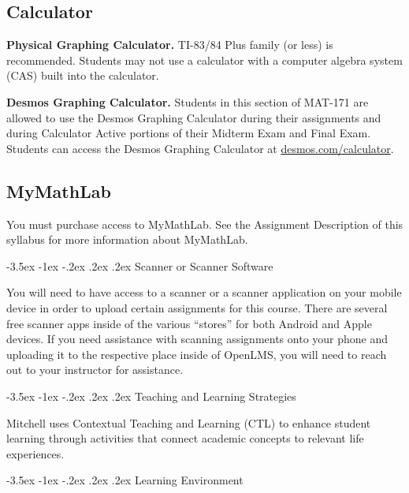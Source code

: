 \documentclass{article}
\makeatletter
\renewcommand\section{\@startsection{section}{1}{0pt}%
  {-3.5ex \@plus -1ex \@minus -.2ex}%
  {.2ex \@plus.2ex}%
  {\normalfont\Large\bfseries}} %
\makeatother
\begin{document}
\subsection{Calculator}

\textbf{Physical Graphing Calculator.} TI-83/84 Plus family (or less) is recommended. Students may not use a calculator with a computer algebra system (CAS) built into the calculator.

\textbf{Desmos Graphing Calculator.} Students in this section of MAT-171 are allowed to use the Desmos Graphing Calculator during their assignments and during Calculator Active portions of their Midterm Exam and Final Exam. Students can access the Desmos Graphing Calculator at \href{https://www.desmos.com/calculator}{desmos.com/calculator}.

\subsection{MyMathLab}

You must purchase access to MyMathLab. See the Assignment Description of this syllabus for more information about MyMathLab.

\section{Scanner or Scanner Software}

You will need to have access to a scanner or a scanner application on your mobile device in order to upload certain assignments for this course. There are several free scanner apps inside of the various ``stores'' for both Android and Apple devices. If you need assistance with scanning assignments onto your phone and uploading it to the respective place inside of OpenLMS, you will need to reach out to your instructor for assistance.

\section{Teaching and Learning Strategies}

Mitchell uses Contextual Teaching and Learning (CTL) to enhance student learning through activities that connect academic concepts to relevant life experiences.

\section{Learning Environment}
\end{document}

